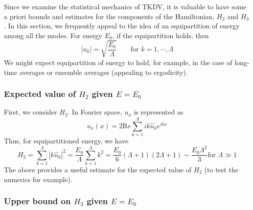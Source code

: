 \documentclass[12pt]{article}
\newcommand{\abs}[1]{\left| #1 \right|}
\newcommand{\uhat}{\hat{u}}
\newcommand{\Real}{\text{Re}}
\newcommand{\sumk}{\sum_{k=1}^{\Lambda}}
\begin{document}
Since we examine the statistical mechanics of TKDV, it is valuable to have some a priori bounds and estimates for the components of the Hamiltonian, $H_2$ and $H_3$. In this section, we frequently appeal to the idea of an equipartition of energy among all the modes. For energy $E_0$, if the equipartition holds, then
\begin{equation}
\abs{u_k} = \sqrt{\frac{E_0}{\Lambda}} \qquad \text{for } k=1,\cdots,\Lambda
\end{equation}
We might expect equipartition of energy to hold, for example, in the case of long-time averages or ensemble averages (appealing to ergodicity).

\subsubsection{Expected value of $H_2$ given $E=E_0$}

First, we consider $H_2$. In Fourier space, $u_x$ is represented as
\begin{equation}
u_x(x) = 2 \Real \sumk i k \uhat_k e^{i k x}
\end{equation}
Thus, for equipartitioned energy, we have
\begin{equation}
H_2 = \sumk \abs{k \uhat_k}^2 = \frac{E_0}{\Lambda} \sumk k^2 = \frac{E_0}{6} (\Lambda+1)(2 \Lambda+1) \sim \frac{E_0 \Lambda^2}{3} \text{for } \Lambda \gg 1
\end{equation}
The above provides a useful estimate for the expected value of $H_2$ (to test the numerics for example).

\subsubsection{Upper bound on $H_3$ given $E=E_0$}
\end{document}
